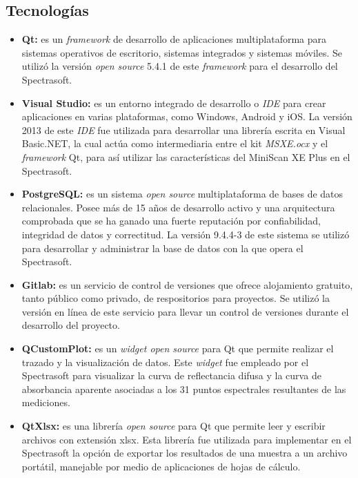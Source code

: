 	\subsection{Tecnolog\'{i}as}
	
		\begin{itemize}
			
			\item \textbf{Qt:} es un \textit{framework} de desarrollo de aplicaciones multiplataforma para sistemas operativos de escritorio, sistemas integrados y sistemas m\'{o}viles. Se utiliz\'{o} la versi\'{o}n \textit{open source} 5.4.1 de este \textit{framework} para el desarrollo del Spectrasoft.
			
			\item \textbf{Visual Studio:} es un entorno integrado de desarrollo o \textit{IDE} para crear aplicaciones en varias plataformas, como Windows, Android y iOS. La versi\'{o}n 2013 de este \textit{IDE} fue utilizada para desarrollar una librer\'{i}a escrita en Visual Basic.NET, la cual act\'{u}a como intermediaria entre el kit \textit{MSXE.ocx} y el \textit{framework} Qt, para as\'{i} utilizar las caracter\'{i}sticas del MiniScan XE Plus en el Spectrasoft.
			
			\item \textbf{PostgreSQL:} es un sistema \textit{open source} multiplataforma de bases de datos relacionales. Posee m\'{a}s de 15 a\~{n}os de desarrollo activo y una arquitectura comprobada que se ha ganado una fuerte reputaci\'{o}n por confiabilidad, integridad de datos y correctitud. La versi\'{o}n 9.4.4-3 de este sistema se utiliz\'{o} para desarrollar y administrar la base de datos con la que opera el Spectrasoft.
			
			\item \textbf{Gitlab:} es un servicio de control de versiones que ofrece alojamiento gratuito, tanto p\'{u}blico como privado, de respositorios para proyectos. Se utiliz\'{o} la versi\'{o}n en l\'{i}nea de este servicio para llevar un control de versiones durante el desarrollo del proyecto.
			
			\item \textbf{QCustomPlot:} es un \textit{widget open source} para Qt que permite realizar el trazado y la visualizaci\'{o}n de datos. Este \textit{widget} fue empleado por el Spectrasoft para visualizar la curva de reflectancia difusa y la curva de absorbancia aparente asociadas a los 31 puntos espectrales resultantes de las mediciones.
			
			\item \textbf{QtXlsx:} es una librer\'{i}a \textit{open source} para Qt que permite leer y escribir archivos con extensi\'{o}n xlsx. Esta librer\'{i}a fue utilizada para implementar en el Spectrasoft la opci\'{o}n de exportar los resultados de una muestra a un archivo port\'{a}til, manejable por medio de aplicaciones de hojas de c\'{a}lculo.
		\end{itemize}


